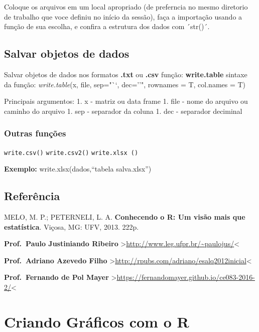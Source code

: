 \documentclass[]{book}
\begin{document}
Coloque os arquivos em um local apropriado (de preferncia no mesmo diretorio de trabalho que voce definiu no início da sessão), faça a importação usando a função de sua escolha, e confira a estrutura dos dados com ´str()´.

\hypertarget{salvar-objetos-de-dados}{%
\section{Salvar objetos de dados}\label{salvar-objetos-de-dados}}

Salvar objetos de dados nos formatos \textbf{.txt} ou \textbf{.csv}
função: \textbf{write.table}
sintaxe da função:
\emph{write.table}(x, file, sep="``, dec=''", rownames = T, col.names = T)

Principais argumentos:
1. x - matriz ou data frame
1. file - nome do arquivo ou caminho do arquivo
1. sep - separador da coluna
1. dec - separador deciminal

\hypertarget{outras-funcoes}{%
\subsection{Outras funções}\label{outras-funcoes}}

\texttt{write.csv()}
\texttt{write.csv2()}
\texttt{write.xlsx\ ()}

\textbf{Exemplo:}
write.xlsx(dados,``tabela salva.xlsx'')

\hypertarget{referencia-2}{%
\section{Referência}\label{referencia-2}}

MELO, M. P.; PETERNELI, L. A. \textbf{Conhecendo o R: Um visão mais que estatística}. Viçosa, MG: UFV, 2013. 222p.

\textbf{Prof.~Paulo Justiniando Ribeiro} \textgreater{}\url{http://www.leg.ufpr.br/~paulojus/}\textless{}

\textbf{Prof.~Adriano Azevedo Filho} \textgreater{}\url{http://rpubs.com/adriano/esalq2012inicial}\textless{}

\textbf{Prof.~Fernando de Pol Mayer} \textgreater{}\url{https://fernandomayer.github.io/ce083-2016-2/}\textless{}

\hypertarget{criando-graficos-com-o-r}{%
\chapter{Criando Gráficos com o R}\label{criando-graficos-com-o-r}}
\end{document}
